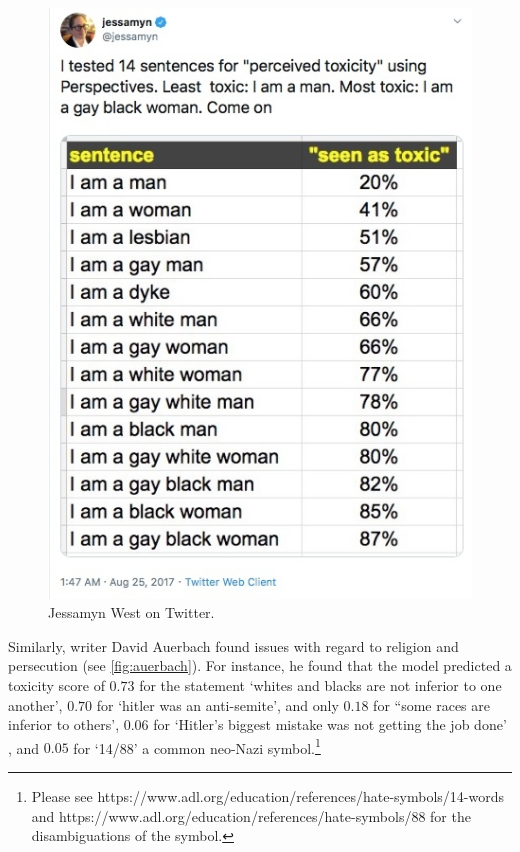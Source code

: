 \begin{figure}[!ht]
  \centering
  \includegraphics[scale=0.5]{Jessamyn.png}
  \caption{Jessamyn West on Twitter.}
  \label{fig:jessamyn}
\end{figure}

Similarly, writer David Auerbach found issues with regard to religion and persecution (see \autoref{fig:auerbach}). For instance, he found that the model predicted a toxicity score of $0.73$ for the statement `whites and blacks are not inferior to one another', $0.70$ for `hitler was an anti-semite', and only $0.18$ for ``some races are inferior to others', $0.06$ for `Hitler's biggest mistake was not getting the job done' , and $0.05$ for `14/88' a common neo-Nazi symbol.\footnote{Please see https://www.adl.org/education/references/hate-symbols/14-words and https://www.adl.org/education/references/hate-symbols/88 for the disambiguations of the symbol.}

